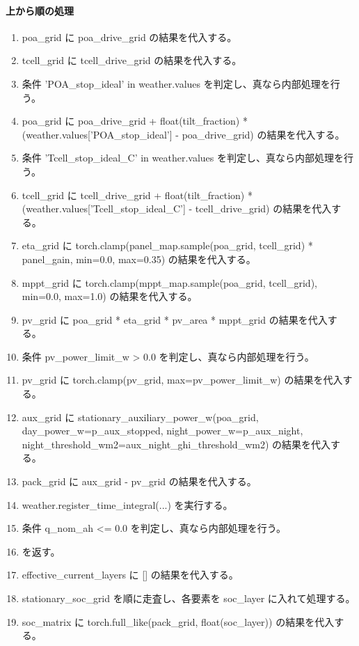 \documentclass[a4paper,11pt]{article}
\begin{document}
            \paragraph{上から順の処理}
            \begin{enumerate}[leftmargin=1.8em]
            \item poa\_grid に poa\_drive\_grid の結果を代入する。
\item tcell\_grid に tcell\_drive\_grid の結果を代入する。
\item 条件 'POA\_stop\_ideal' in weather.values を判定し、真なら内部処理を行う。
\item   poa\_grid に poa\_drive\_grid + float(tilt\_fraction) * (weather.values['POA\_stop\_ideal'] - poa\_drive\_grid) の結果を代入する。
\item 条件 'Tcell\_stop\_ideal\_C' in weather.values を判定し、真なら内部処理を行う。
\item   tcell\_grid に tcell\_drive\_grid + float(tilt\_fraction) * (weather.values['Tcell\_stop\_ideal\_C'] - tcell\_drive\_grid) の結果を代入する。
\item eta\_grid に torch.clamp(panel\_map.sample(poa\_grid, tcell\_grid) * panel\_gain, min=0.0, max=0.35) の結果を代入する。
\item mppt\_grid に torch.clamp(mppt\_map.sample(poa\_grid, tcell\_grid), min=0.0, max=1.0) の結果を代入する。
\item pv\_grid に poa\_grid * eta\_grid * pv\_area * mppt\_grid の結果を代入する。
\item 条件 pv\_power\_limit\_w > 0.0 を判定し、真なら内部処理を行う。
\item   pv\_grid に torch.clamp(pv\_grid, max=pv\_power\_limit\_w) の結果を代入する。
\item aux\_grid に stationary\_auxiliary\_power\_w(poa\_grid, day\_power\_w=p\_aux\_stopped, night\_power\_w=p\_aux\_night, night\_threshold\_wm2=aux\_night\_ghi\_threshold\_wm2) の結果を代入する。
\item pack\_grid に aux\_grid - pv\_grid の結果を代入する。
\item weather.register\_time\_integral(...) を実行する。
\item 条件 q\_nom\_ah <= 0.0 を判定し、真なら内部処理を行う。
\item    を返す。
\item effective\_current\_layers に [] の結果を代入する。
\item stationary\_soc\_grid を順に走査し、各要素を soc\_layer に入れて処理する。
\item   soc\_matrix に torch.full\_like(pack\_grid, float(soc\_layer)) の結果を代入する。

\end{enumerate}
\end{document}
